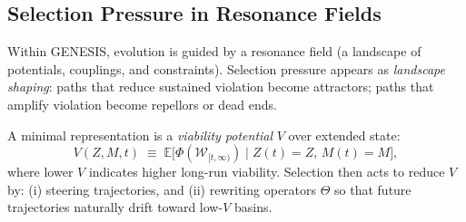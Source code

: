 \documentclass[11pt]{article}
\begin{document}
\subsection{Selection Pressure in Resonance Fields}
\label{sec:selection-pressure}

Within GENESIS, evolution is guided by a resonance field (a landscape of potentials, couplings,
and constraints). Selection pressure appears as \emph{landscape shaping}:
paths that reduce sustained violation become attractors; paths that amplify violation become
repellors or dead ends.

A minimal representation is a \emph{viability potential} $V$ over extended state:
\[
V(Z,M,t) \;\equiv\; \mathbb{E}\Big[\Phi(\mathcal{W}_{[t,\infty)}) \mid Z(t)=Z,\,M(t)=M \Big],
\]
where lower $V$ indicates higher long-run viability. Selection then acts to reduce $V$ by:
(i) steering trajectories, and (ii) rewriting operators $\Theta$ so that future trajectories
naturally drift toward low-$V$ basins.
\end{document}
